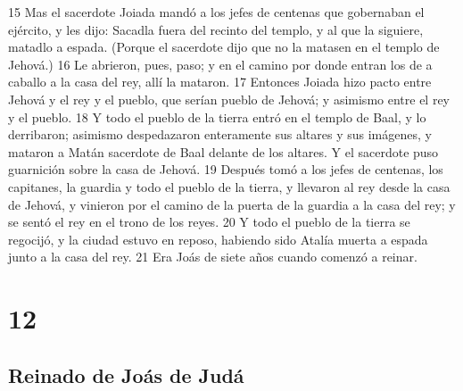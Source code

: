 15 Mas el sacerdote Joiada mandó a los jefes de centenas que gobernaban el ejército, y les dijo: Sacadla fuera del recinto del templo, y al que la siguiere, matadlo a espada. (Porque el sacerdote dijo que no la matasen en el templo de Jehová.)
16 Le abrieron, pues, paso; y en el camino por donde entran los de a caballo a la casa del rey, allí la mataron.
17 Entonces Joiada hizo pacto entre Jehová y el rey y el pueblo, que serían pueblo de Jehová; y asimismo entre el rey y el pueblo.
18 Y todo el pueblo de la tierra entró en el templo de Baal, y lo derribaron; asimismo despedazaron enteramente sus altares y sus imágenes, y mataron a Matán sacerdote de Baal delante de los altares. Y el sacerdote puso guarnición sobre la casa de Jehová.
19 Después tomó a los jefes de centenas, los capitanes, la guardia y todo el pueblo de la tierra, y llevaron al rey desde la casa de Jehová, y vinieron por el camino de la puerta de la guardia a la casa del rey; y se sentó el rey en el trono de los reyes.
20 Y todo el pueblo de la tierra se regocijó, y la ciudad estuvo en reposo, habiendo sido Atalía muerta a espada junto a la casa del rey.
21 Era Joás de siete años cuando comenzó a reinar.

\chapter{12}

\section*{Reinado de Joás de Judá}

 

